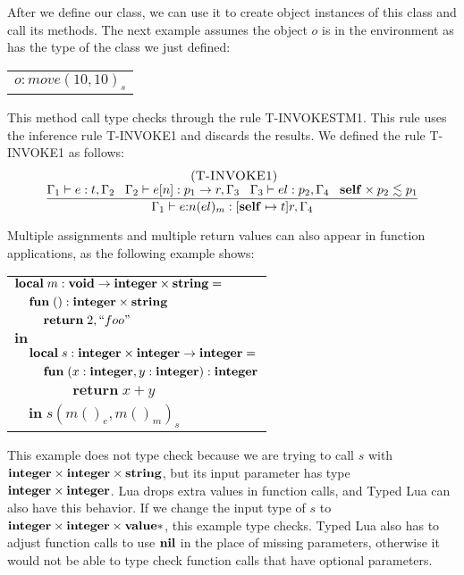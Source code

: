 After we define our class, we can use it to create object instances
of this class and call its methods.
The next example assumes the object $o$ is in the environment as
has the type of the class we just defined:
\begin{center}
\begin{tabular}{l}
$o{:}move(10, 10)_{s}$
\end{tabular}
\end{center}

This method call type checks through the rule \textsc{T-INVOKESTM1}.
This rule uses the inference rule \textsc{T-INVOKE1} and discards the results.
We defined the rule \textsc{T-INVOKE1} as follows:
\[
\begin{array}{c}
\; (\textsc{T-INVOKE1})\\
\dfrac{\Gamma_{1} \vdash e:t, \Gamma_{2} \;\;\;
       \Gamma_{2} \vdash e[n]:p_{1} \rightarrow r, \Gamma_{3} \;\;\;
       \Gamma_{3} \vdash el:p_{2}, \Gamma_{4} \;\;\;
       \mathbf{self} \times p_{2} \lesssim p_{1}}
      {\Gamma_{1} \vdash e{:}n(el)_{m}:[\mathbf{self} \mapsto t]r, \Gamma_{4}}
\end{array}
\]

Multiple assignments and multiple return values can also appear in
function applications, as the following example shows:
\begin{center}
\begin{tabular}{llll}
\multicolumn{4}{l}{$\mathbf{local} \; m:\mathbf{void} \rightarrow \mathbf{integer} \times \mathbf{string} =$} \\
& \multicolumn{3}{l}{$\mathbf{fun} \; ():\mathbf{integer} \times \mathbf{string}$} \\
& & \multicolumn{2}{l}{$\mathbf{return} \; 2, ``foo"$} \\
\multicolumn{4}{l}{$\mathbf{in}$} \\
& \multicolumn{3}{l}{$\mathbf{local} \; s:\mathbf{integer} \times \mathbf{integer} \rightarrow \mathbf{integer} =$} \\
& & \multicolumn{2}{l}{$\mathbf{fun} \; (x:\mathbf{integer}, y:\mathbf{integer}):\mathbf{integer}$} \\
& & & \multicolumn{1}{l}{$\mathbf{return} \; x + y$} \\
& \multicolumn{3}{l}{$\mathbf{in} \; s(m()_{e}, m()_{m})_{s}$}
\end{tabular}
\end{center}

This example does not type check because we are trying to call
$s$ with $\mathbf{integer} \times \mathbf{integer} \times \mathbf{string}$,
but its input parameter has type $\mathbf{integer} \times \mathbf{integer}$.
Lua drops extra values in function calls, and Typed Lua can also
have this behavior.
If we change the input type of $s$ to $\mathbf{integer} \times \mathbf{integer} \times \mathbf{value}{*}$,
this example type checks.
Typed Lua also has to adjust function calls to use $\mathbf{nil}$ in the
place of missing parameters, otherwise it would not be able to
type check function calls that have optional parameters.

